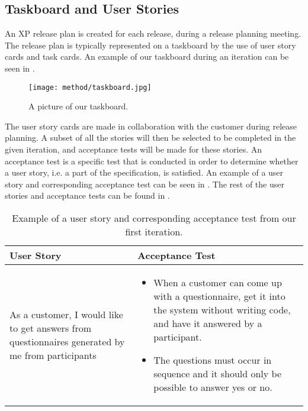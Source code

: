 \subsection{Taskboard and User Stories}
\label{sub:taskboard_and_user_stories}
An XP release plan is created for each release, during a release planning meeting. The release plan is typically represented on a taskboard by the use of user story cards and task cards. An example of our taskboard during an iteration can be seen in .

\begin{figure}[!htbp]
    \centering
    \texttt{[image: method/taskboard.jpg]}
    \caption{A picture of our taskboard.}
    \label{fig:taskboard}
\end{figure}

The user story cards are made in collaboration with the customer during release planning.  A subset of all the stories will then be selected to be completed in the given iteration, and acceptance tests will be made for these stories. An acceptance test is a specific test that is conducted in order to determine whether a user story, i.e. a part of the specification, is satisfied. An example of a user story and corresponding acceptance test can be seen in . The rest of the user stories and acceptance tests can be found in .

\begin{table}[!htbp]
    \centering
    \begin{tabular}{| m{} | m{} |}
        \hline
        \textbf{User Story} & \textbf{Acceptance Test} \\ \hline
        As a customer, I would like to get answers from questionnaires generated by me from participants & 
        \begin{itemize}[noitemsep,parsep=0pt,partopsep=0pt]
        \item When a customer can come up with a questionnaire, get it into the system without writing code, and have it answered by a participant.
        \item The questions must occur in sequence and it should only be possible to answer yes or no.
     \end{itemize} \\ \hline
    \end{tabular}
    \caption{Example of a user story and corresponding acceptance test from our first iteration.}
    \label{tab:user_story_acceptance_test_example}
\end{table}
\FloatBarrier

